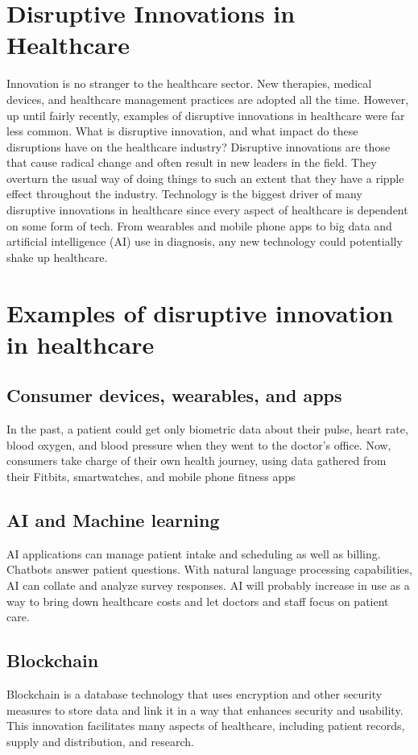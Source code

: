 \documentclass[12pt]{article}
\begin{document}
\section{Disruptive Innovations in Healthcare}
Innovation is no stranger to the healthcare sector. New therapies, medical devices, and healthcare management practices are adopted all the time. However, up until fairly recently, examples of disruptive innovations in healthcare were far less common. What is disruptive innovation, and what impact do these disruptions have on the healthcare industry? Disruptive innovations are those that cause radical change and often result in new leaders in the field. They overturn the usual way of doing things to such an extent that they have a ripple effect throughout the industry. \newline
Technology is the biggest driver of many disruptive innovations in healthcare since every aspect of healthcare is dependent on some form of tech. From wearables and mobile phone apps to big data and artificial intelligence (AI) use in diagnosis, any new technology could potentially shake up healthcare.

\section{Examples of disruptive innovation in healthcare}
\subsection{Consumer devices, wearables, and apps}
In the past, a patient could get only biometric data about their pulse, heart rate, blood oxygen, and blood pressure when they went to the doctor’s office. Now, consumers take charge of their own health journey, using data gathered from their Fitbits, smartwatches, and mobile phone fitness apps
\subsection{AI and Machine learning}
AI applications can manage patient intake and scheduling as well as billing. Chatbots answer patient questions. With natural language processing capabilities, AI can collate and analyze survey responses. AI will probably increase in use as a way to bring down healthcare costs and let doctors and staff focus on patient care.
\subsection{Blockchain}
Blockchain is a database technology that uses encryption and other security measures to store data and link it in a way that enhances security and usability. This innovation facilitates many aspects of healthcare, including patient records, supply and distribution, and research.
\end{document}
